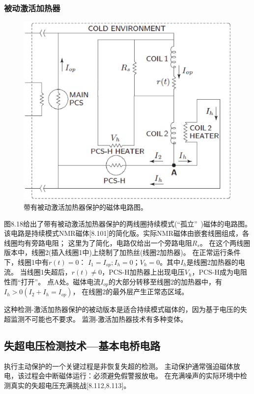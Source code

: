 \subsubsection*{被动激活加热器}
\begin{figure}
	\centering
	\includegraphics[scale=0.5]{chpt8/figs/fig8.18.eps}
	\caption{带有被动激活加热器保护的磁体电路图。}
\end{figure}

图8.18给出了带有被动激活加热器保护的两线圈持续模式(“孤立”~)磁体的电路图。
该电路是持续模式NMR磁体[8.101]的简化版。实际NMR磁体由嵌套线圈组成，各线圈均有旁路电阻；
这里为了简化，电路仅给出一个旁路电阻$R_s$。
在这个两线圈版本中，线圈2(插入线圈1中)上绕制了加热丝(线圈2加热器)。
在正常运行条件下，线圈1中有$r(t)=0$：
$I_1=I_{op};I_h=0；V_h=0$。其中$I_h$是线圈2加热器的电流。
当线圈1失超后，$r(t)\neq 0$，PCS-H加热器上出现电压$V_h$，PCS-H成为电阻性而“打开”。
点A处。磁体电流$I_{op}$的大部分转移至线圈2的加热器中，有$I_h>0(I_2+I_h=I_{op})$，
在线圈2的最外层产生正常态区域。

这种检测-激活加热器保护的被动版本是适合持续模式磁体的，因为基于电压的失超监测不可能也不要求。
监测-激活加热器技术有多种变体。



\subsection{失超电压检测技术---基本电桥电路}
执行主动保护的一个关键过程是非恢复失超的检测。
主动保护通常强迫磁体放电，该过程会中断磁体运行：必须避免假警报放电。
在充满噪声的实际环境中检测真实的失超电压充满挑战[8.112,8.113]。

